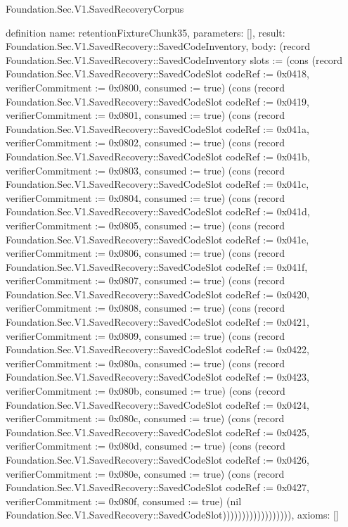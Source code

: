 \begin{lexlean}{Foundation.Sec.V1.SavedRecoveryCorpus}
\begin{semanticmodule}
definition{
  name: retentionFixtureChunk35,
  parameters: [],
  result: Foundation.Sec.V1.SavedRecovery::SavedCodeInventory,
  body: (record Foundation.Sec.V1.SavedRecovery::SavedCodeInventory {slots := (cons (record Foundation.Sec.V1.SavedRecovery::SavedCodeSlot {codeRef := 0x0418, verifierCommitment := 0x0800, consumed := true}) (cons (record Foundation.Sec.V1.SavedRecovery::SavedCodeSlot {codeRef := 0x0419, verifierCommitment := 0x0801, consumed := true}) (cons (record Foundation.Sec.V1.SavedRecovery::SavedCodeSlot {codeRef := 0x041a, verifierCommitment := 0x0802, consumed := true}) (cons (record Foundation.Sec.V1.SavedRecovery::SavedCodeSlot {codeRef := 0x041b, verifierCommitment := 0x0803, consumed := true}) (cons (record Foundation.Sec.V1.SavedRecovery::SavedCodeSlot {codeRef := 0x041c, verifierCommitment := 0x0804, consumed := true}) (cons (record Foundation.Sec.V1.SavedRecovery::SavedCodeSlot {codeRef := 0x041d, verifierCommitment := 0x0805, consumed := true}) (cons (record Foundation.Sec.V1.SavedRecovery::SavedCodeSlot {codeRef := 0x041e, verifierCommitment := 0x0806, consumed := true}) (cons (record Foundation.Sec.V1.SavedRecovery::SavedCodeSlot {codeRef := 0x041f, verifierCommitment := 0x0807, consumed := true}) (cons (record Foundation.Sec.V1.SavedRecovery::SavedCodeSlot {codeRef := 0x0420, verifierCommitment := 0x0808, consumed := true}) (cons (record Foundation.Sec.V1.SavedRecovery::SavedCodeSlot {codeRef := 0x0421, verifierCommitment := 0x0809, consumed := true}) (cons (record Foundation.Sec.V1.SavedRecovery::SavedCodeSlot {codeRef := 0x0422, verifierCommitment := 0x080a, consumed := true}) (cons (record Foundation.Sec.V1.SavedRecovery::SavedCodeSlot {codeRef := 0x0423, verifierCommitment := 0x080b, consumed := true}) (cons (record Foundation.Sec.V1.SavedRecovery::SavedCodeSlot {codeRef := 0x0424, verifierCommitment := 0x080c, consumed := true}) (cons (record Foundation.Sec.V1.SavedRecovery::SavedCodeSlot {codeRef := 0x0425, verifierCommitment := 0x080d, consumed := true}) (cons (record Foundation.Sec.V1.SavedRecovery::SavedCodeSlot {codeRef := 0x0426, verifierCommitment := 0x080e, consumed := true}) (cons (record Foundation.Sec.V1.SavedRecovery::SavedCodeSlot {codeRef := 0x0427, verifierCommitment := 0x080f, consumed := true}) (nil Foundation.Sec.V1.SavedRecovery::SavedCodeSlot)))))))))))))))))}),
  axioms: []
}


\end{semanticmodule}
\end{lexlean}
